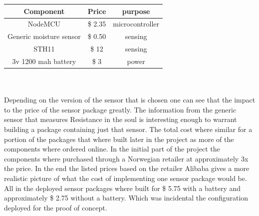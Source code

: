 \documentclass[]{uiophd}
\begin{document}
\begin{center}
 \begin{tabular}{||c | c| c ||} 
 \hline
 Component & Price & purpose\\ [0.5ex] 
 \hline\hline
 NodeMCU & \$ 2.35 & microcontroller\\ 
 \hline
 Generic moisture sensor & \$ 0.50 & sensing\\
 \hline
 STH11 & \$ 12 & sensing\\
 \hline
 3v 1200 mah battery & \$ 3 & power \\
 \hline
\end{tabular}
\end{center}
\\\\
Depending on the version of the sensor that is chosen one can see that the impact to the price of the sensor package greatly. The information from the generic sensor that measures Resistance in the soul is interesting enough to warrant building a package containing just that sensor. The total cost where similar for a portion of the packages that where built later in the project as  more of the components where ordered online. In the initial part of the project the components where purchased through a Norwegian retailer at approximately 3x the price. In the end the listed prices based on the retailer Alibaba gives a more realistic picture of what the cost of implementing one sensor package would be. All in the deployed sensor packages where built for \$ 5.75 with a battery and approximately \$ 2.75 without a battery. Which was incidental the configuration deployed for the proof of concept.
\end{document}
